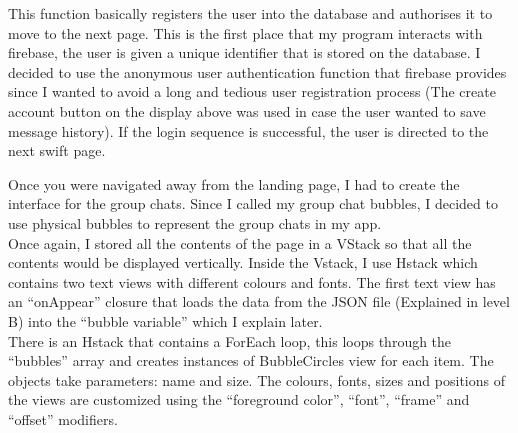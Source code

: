 \documentclass[a4paper, 11pt]{report}
\begin{document}
This function basically registers the user into the database and authorises it to move to the next page. This is the first place that my program interacts with firebase, the user is given a unique identifier that is stored on the database. I decided to use the anonymous user authentication function that firebase provides since I wanted to avoid a long and tedious user registration process (The create account button on the display above was used in case the user wanted to save message history). If the login sequence is successful, the user is directed to the next swift page.

Once you were navigated away from the landing page, I had to create the interface for the group chats. Since I called my group chat bubbles, I decided to use physical bubbles to represent the group chats in my app.\\

Once again, I stored all the contents of the page in a VStack so that all the contents would be displayed vertically. Inside the Vstack, I use  Hstack which contains two text views with different colours and fonts. The first text view has an “onAppear” closure that loads the data from the JSON file (Explained in level B) into the “bubble variable” which I explain later. \\
There is an Hstack that contains a ForEach loop, this loops through the “bubbles” array and creates instances of BubbleCircles view for each item. The objects take parameters: name and size.
The colours, fonts, sizes and positions of the views are customized using the “foreground color”, “font”, “frame” and “offset” modifiers.
\end{document}
